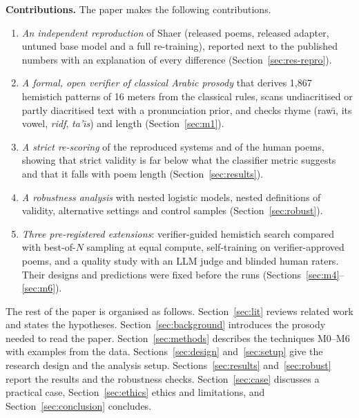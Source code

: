 \textbf{Contributions.} The paper makes the following contributions.
\begin{enumerate}
\item \emph{An independent reproduction} of Shaer (released poems, released adapter, untuned base model and a full
re-training), reported next to the published numbers with an explanation of every difference
(Section~\ref{sec:res-repro}).
\item \emph{A formal, open verifier of classical Arabic prosody} that derives 1,867 hemistich patterns of 16 meters
from the classical rules, scans undiacritised or partly diacritised text with a pronunciation prior, and checks
rhyme (raw\={\i}, its vowel, \emph{ridf}, \emph{ta'\={\i}s}) and length (Section~\ref{sec:m1}).
\item \emph{A strict re-scoring} of the reproduced systems and of the human poems, showing that strict validity is far
below what the classifier metric suggests and that it falls with poem length (Section~\ref{sec:results}).
\item \emph{A robustness analysis} with nested logistic models, nested definitions of validity, alternative settings
and control samples (Section~\ref{sec:robust}).
\item \emph{Three pre-registered extensions}: verifier-guided hemistich search compared with best-of-$N$ sampling at
equal compute, self-training on verifier-approved poems, and a quality study with an LLM judge and blinded human
raters. Their designs and predictions were fixed before the runs (Sections~\ref{sec:m4}--\ref{sec:m6}).
\end{enumerate}

The rest of the paper is organised as follows. Section~\ref{sec:lit} reviews related work and states the hypotheses.
Section~\ref{sec:background} introduces the prosody needed to read the paper. Section~\ref{sec:methods} describes the
techniques M0--M6 with examples from the data. Sections~\ref{sec:design} and~\ref{sec:setup} give the research
design and the analysis setup. Sections~\ref{sec:results} and~\ref{sec:robust} report the results and the robustness
checks. Section~\ref{sec:case} discusses a practical case, Section~\ref{sec:ethics} ethics and limitations, and
Section~\ref{sec:conclusion} concludes.
